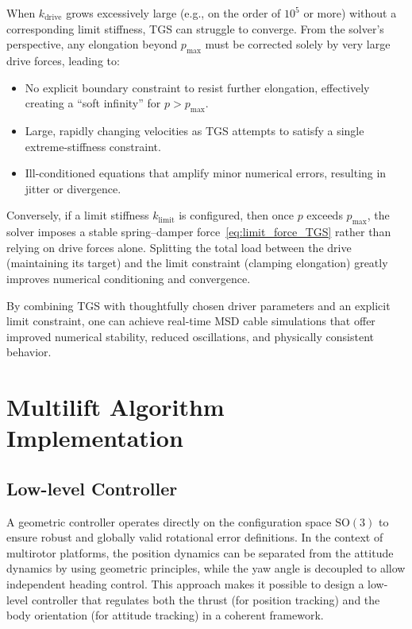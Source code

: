 \documentclass[12pt,twoside,letterpaper]{article}
\begin{document}
When $k_{\text{drive}}$ grows excessively large (e.g., on the order of $10^5$ or more) without a corresponding limit stiffness, TGS can struggle to converge. From the solver's perspective, any elongation beyond $p_{\max}$ must be corrected solely by very large drive forces, leading to:
\begin{itemize}
  \item No explicit boundary constraint to resist further elongation, effectively creating a ``soft infinity'' for $p>p_{\max}$.
  \item Large, rapidly changing velocities as TGS attempts to satisfy a single extreme-stiffness constraint.
  \item Ill-conditioned equations that amplify minor numerical errors, resulting in jitter or divergence.
\end{itemize}
Conversely, if a limit stiffness $k_{\text{limit}}$ is configured, then once $p$ exceeds $p_{\max}$, the solver imposes a stable spring--damper force~\eqref{eq:limit_force_TGS} rather than relying on drive forces alone. Splitting the total load between the drive (maintaining its target) and the limit constraint (clamping elongation) greatly improves numerical conditioning and convergence.


By combining TGS with thoughtfully chosen driver parameters and an explicit limit constraint, one can achieve real-time MSD cable simulations that offer improved numerical stability, reduced oscillations, and physically consistent behavior.


\newpage


\section{Multilift Algorithm Implementation}
\subsection{Low-level Controller}
A geometric controller\cite{geose3} operates directly on the configuration space \(\mathrm{SO}(3)\) to ensure robust and globally valid rotational error definitions. In the context of multirotor platforms, the position dynamics can be separated from the attitude dynamics by using geometric principles, while the yaw angle is decoupled to allow independent heading control\cite{geoyaw}. This approach makes it possible to design a low-level controller that regulates both the thrust (for position tracking) and the body orientation (for attitude tracking) in a coherent framework.
\end{document}
